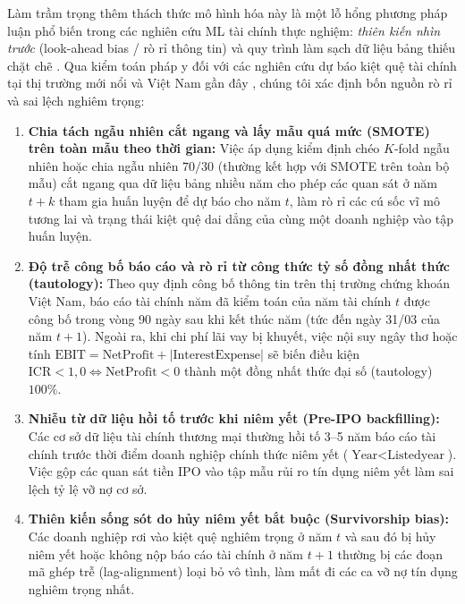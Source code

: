\documentclass[11pt,a4paper]{article}
\begin{document}
Làm trầm trọng thêm thách thức mô hình hóa này là một lỗ hổng phương pháp luận phổ biến trong các nghiên cứu ML tài chính thực nghiệm: \textit{thiên kiến nhìn trước} (look-ahead bias / rò rỉ thông tin) và quy trình làm sạch dữ liệu bảng thiếu chặt chẽ \citep{bailey2014pseudo,lopez2018advances}. Qua kiểm toán pháp y đối với các nghiên cứu dự báo kiệt quệ tài chính tại thị trường mới nổi và Việt Nam gần đây \citep[ví dụ:][]{pham2018financial,vo2019corporate,tran2022explainable,tran2023examining,vu2023lasso}, chúng tôi xác định bốn nguồn rò rỉ và sai lệch nghiêm trọng:
\begin{enumerate}
    \item \textbf{Chia tách ngẫu nhiên cắt ngang và lấy mẫu quá mức (SMOTE) trên toàn mẫu theo thời gian:} Việc áp dụng kiểm định chéo $K$-fold ngẫu nhiên hoặc chia ngẫu nhiên $70/30$ (thường kết hợp với SMOTE trên toàn bộ mẫu) cắt ngang qua dữ liệu bảng nhiều năm cho phép các quan sát ở năm $t+k$ tham gia huấn luyện để dự báo cho năm $t$, làm rò rỉ các cú sốc vĩ mô tương lai và trạng thái kiệt quệ dai dẳng của cùng một doanh nghiệp vào tập huấn luyện.
    \item \textbf{Độ trễ công bố báo cáo và rò rỉ từ công thức tỷ số đồng nhất thức (tautology):} Theo quy định công bố thông tin trên thị trường chứng khoán Việt Nam, báo cáo tài chính năm đã kiểm toán của năm tài chính $t$ được công bố trong vòng 90 ngày sau khi kết thúc năm (tức đến ngày 31/03 của năm $t+1$). Ngoài ra, khi chi phí lãi vay bị khuyết, việc nội suy ngây thơ hoặc tính $\text{EBIT} = \text{NetProfit} + |\text{InterestExpense}|$ sẽ biến điều kiện $\text{ICR} < 1,0 \iff \text{NetProfit} < 0$ thành một đồng nhất thức đại số (tautology) $100\%$.
    \item \textbf{Nhiễu từ dữ liệu hồi tố trước khi niêm yết (Pre-IPO backfilling):} Các cơ sở dữ liệu tài chính thương mại thường hồi tố 3--5 năm báo cáo tài chính trước thời điểm doanh nghiệp chính thức niêm yết ($\text{Year} < \text{Listedyear}$). Việc gộp các quan sát tiền IPO vào tập mẫu rủi ro tín dụng niêm yết làm sai lệch tỷ lệ vỡ nợ cơ sở.
    \item \textbf{Thiên kiến sống sót do hủy niêm yết bắt buộc (Survivorship bias):} Các doanh nghiệp rơi vào kiệt quệ nghiêm trọng ở năm $t$ và sau đó bị hủy niêm yết hoặc không nộp báo cáo tài chính ở năm $t+1$ thường bị các đoạn mã ghép trễ (lag-alignment) loại bỏ vô tình, làm mất đi các ca vỡ nợ tín dụng nghiêm trọng nhất.
\end{enumerate}
\end{document}
